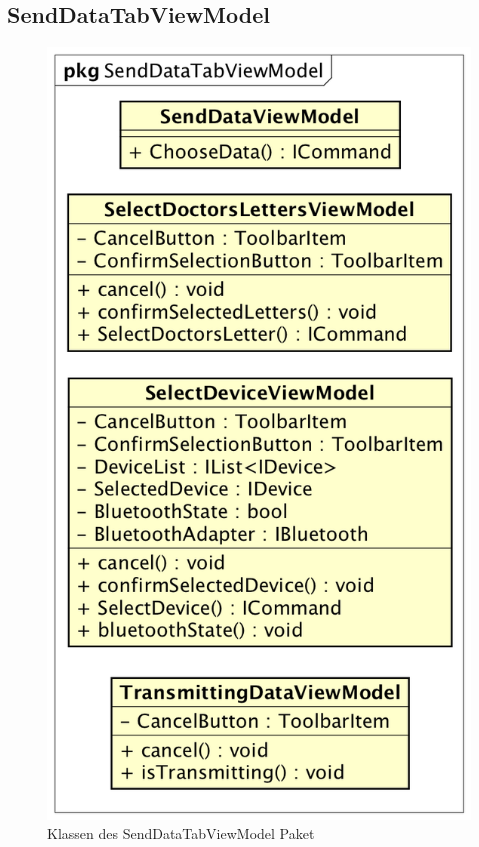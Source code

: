 \documentclass[a4paper]{scrreprt}
\begin{document}
\subsection{SendDataTabViewModel}
\begin{figure}[H]
\centering
\includegraphics[width=0.45\textheight]{graphics/Klassendiagramme/ViewModel/SendDataTabViewModel.png}
\caption{Klassen des SendDataTabViewModel Paket}
\end{figure}
\end{document}
